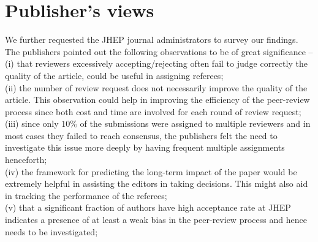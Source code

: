 \noindent
\section{Publisher's views}
\label{implication}
We further requested the JHEP journal administrators to survey our findings. The publishers pointed out the following observations to be of great significance -- \\
(i) that reviewers excessively accepting/rejecting often fail to judge correctly the quality of the article, could be useful in assigning referees;\\
(ii) the number of review request does not necessarily improve the quality of the article. This observation could help in improving the efficiency of the peer-review process since both cost and time are involved for each round of review request; \\
(iii) since only $10\%$ of the submissions were assigned to multiple reviewers and in most cases they failed to reach consensus, the publishers felt the need to investigate this issue more deeply by having frequent multiple assignments henceforth;\\ 
(iv) the framework for predicting the long-term impact of the paper would be extremely helpful in assisting the editors in taking decisions. This might also aid in tracking the performance of the referees;\\
(v) that a significant fraction of authors have high acceptance rate at JHEP indicates a presence of at least a weak bias in the peer-review process and hence needs to be investigated;\\
\medskip